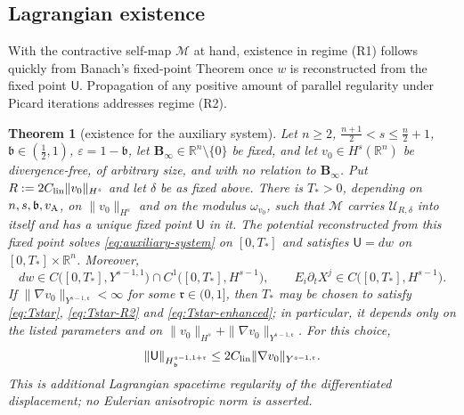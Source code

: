 \documentclass[11pt,reqno]{amsart}
\theoremstyle{plain}
\newtheorem{theorem}{Theorem}[section]
\theoremstyle{definition}
\theoremstyle{remark}
\numberwithin{equation}{section}
\newcommand{\breg}{\mathfrak b}
\newcommand{\rpar}{\mathfrak r}
\newcommand{\Ufield}{\mathsf U}
\newcommand{\Binf}{\mathbf B_\infty}
\newcommand{\Real}{\mathbb R}
\newcommand{\Rn}{\Real^n}
\begin{document}
\subsection{Lagrangian existence} With the contractive self-map $\mathcal{M}$ at hand,  existence in regime \textup{(R1)} follows quickly from Banach's fixed-point Theorem once $w$ is reconstructed from the fixed point $\Ufield$. Propagation of any positive amount of parallel regularity under Picard iterations addresses regime \textup{(R2)}.

\begin{theorem}[existence for the auxiliary system]\label{thm:existence}
Let $n\ge2$, $\frac{n+1}2<s\le\frac n2+1$, $\breg\in(\frac12,1)$, $\varepsilon=1-\breg$,
let $\Binf\in\Rn\setminus\{0\}$ be fixed, and let
$v_0\in H^{s}(\Rn)$ be divergence-free, of arbitrary size, and with no relation to
$\Binf$. Put
$R:=2C_{\rm lin}\|v_0\|_{H^{s}}$ and let $\delta$ be as
fixed above. There is $T_*>0$, depending on $n,s,\breg,v_{\rm A}$, on
$\|v_0\|_{H^{s}}$ and on the modulus $\omega_{v_0}$, such that $\mathcal M$ carries $\mathcal U_{R,\delta}$
into itself and has a unique fixed point $\Ufield$ in it.  The potential reconstructed from this
fixed point solves \eqref{eq:auxiliary-system} on $[0,T_*]$ and satisfies
$\Ufield=dw$ on $[0,T_*]\times\Rn$. Moreover,
\begin{equation}\label{eq:existence-traces}
 dw\in C\big([0,T_*],Y^{s-1,1}\big)\cap C^1\big([0,T_*],H^{s-1}\big),
 \qquad
 E_i\partial_tX^j\in C\big([0,T_*],H^{s-1}\big).
\end{equation}
If $\|\nabla v_0\|_{Y^{s-1,\rpar}}<\infty$ for some
$\rpar\in(0,1]$, then $T_*$ may be chosen to satisfy
\eqref{eq:Tstar}, \eqref{eq:Tstar-R2} and
\eqref{eq:Tstar-enhanced}; in particular, it depends only on the listed
parameters and on
$\|v_0\|_{H^s}+\|\nabla v_0\|_{Y^{s-1,\rpar}}$.  For this choice,
\begin{equation}\label{eq:longitudinal-propagation}
 \|\Ufield\|_{H^{s-1,1+\rpar}_{\breg}}
 \le 2C_{\rm lin}\|\nabla v_0\|_{Y^{s-1,\rpar}}.
\end{equation}
This is additional Lagrangian spacetime regularity of the differentiated
displacement; no Eulerian anisotropic norm is asserted.
\end{theorem}
\end{document}
